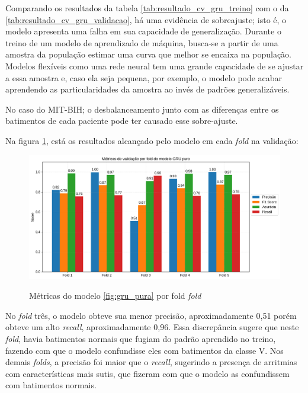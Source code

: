 Comparando os resultados da tabela \ref{tab:resultado_cv_gru_treino} com o da \ref{tab:resultado_cv_gru_validacao}, há uma evidência de sobreajuste; isto é, o modelo apresenta uma falha em sua capacidade
de generalização. Durante o treino de um modelo de aprendizado de máquina, busca-se a partir de uma amostra da população estimar uma curva que melhor
se encaixa na população. Modelos flexíveis como uma rede neural tem uma grande capacidade de se ajustar a essa amostra e, caso ela seja pequena, por exemplo,
o modelo pode acabar aprendendo as particularidades da amostra ao invés de padrões generalizáveis. 

No caso do MIT-BIH; o desbalanceamento junto com as diferenças entre os batimentos de cada paciente pode ter causado esse sobre-ajuste.

Na figura \ref{fig:gru_resultados_por_fold}, está os resultados alcançado pelo modelo em cada \textit{fold} na validação:

\begin{figure}[H]
  \centering
  \caption{Métricas do modelo \ref{fig:gru_pura} por fold \textit{fold}}
   \includegraphics[width=1.0\textwidth]{figuras/modelos_resultados/gru/gru_metricas_por_fold.png} %
  \label{fig:gru_resultados_por_fold}
\end{figure}

No \textit{fold} três, o modelo obteve sua menor precisão, aproximadamente 0,51 porém obteve um alto \textit{recall}, aproximadamente 0,96.
Essa discrepância sugere que neste \textit{fold}, havia batimentos normais que fugiam do padrão aprendido no treino, fazendo com que o modelo
confundisse eles com batimentos da classe V. Nos demais \textit{folds}, a precisão foi maior que o \textit{recall}, sugerindo a presença 
de arritmias com características mais sutis, que fizeram com que o modelo as confundissem com batimentos normais.

